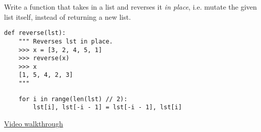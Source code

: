 \question
Write a function that takes in a list and reverses it {\it in place}, i.e.
mutate the given list itself, instead of returning a new list.

\begin{lstlisting}
def reverse(lst):
    """ Reverses lst in place.
    >>> x = [3, 2, 4, 5, 1]
    >>> reverse(x)
    >>> x
    [1, 5, 4, 2, 3]
    """
\end{lstlisting}
\begin{solution}[1.8in]
\begin{lstlisting}
    for i in range(len(lst) // 2):
        lst[i], lst[-i - 1] = lst[-i - 1], lst[i]
\end{lstlisting}
\href{https://www.youtube.com/watch?v=XsdTV6cAAjY&vq=hd1080&t=66m50s}{Video walkthrough}
\end{solution}
